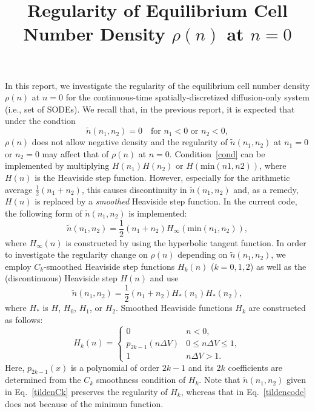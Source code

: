 \documentclass{article}
\begin{document}
\title{Regularity of Equilibrium Cell Number Density $\rho(n)$ at $n=0$}
\author{}
\date{}

\maketitle

\noindent In this report, we investigate the regularity of the equilibrium cell number density $\rho(n)$ at $n=0$ for the continuous-time spatially-discretized diffusion-only system (i.e., set of SODEs).
We recall that, in the previous report, it is expected that under the condtion
\begin{equation}
\label{cond}
\tilde{n}(n_1,n_2) = 0\quad\mbox{for $n_1<0$ or $n_2<0$},
\end{equation}
$\rho(n)$ does not allow negative density and the regularity of $\tilde{n}(n_1,n_2)$ at $n_1=0$ or $n_2=0$ may affect that of $\rho(n)$ at $n=0$.
Condition~\eqref{cond} can be implemented by multiplying $H(n_1)H(n_2)$ or $H(\mathrm{min}(n1,n2))$, where $H(n)$ is the Heaviside step function.
However, especially for the arithmetic average $\frac{1}{2}(n_1+n_2)$, this causes discontinuity in $\tilde{n}(n_1,n_2)$ and, as a remedy, $H(n)$ is replaced by a \textit{smoothed} Heaviside step function.
In the current code, the following form of $\tilde{n}(n_1,n_2)$ is implemented:
\begin{equation}
\label{tildencode}
\tilde{n}(n_1,n_2) = \frac{1}{2}(n_1+n_2)H_\infty(\mathrm{min}(n_1,n_2)),
\end{equation}
where $H_\infty(n)$ is constructed by using the hyperbolic tangent function.
In order to investigate the regularity change on $\rho(n)$ depending on $\tilde{n}(n_1,n_2)$, we employ $C_k$-smoothed Heaviside step functions $H_k(n)$ ($k=0,1,2$) as well as the (discontinuous) Heaviside step $H(n)$ and use 
\begin{equation}
\label{tildenCk}
\tilde{n}(n_1,n_2) = \frac{1}{2}(n_1+n_2)H_*(n_1) H_*(n_2),
\end{equation}
where $H_*$ is $H$, $H_0$, $H_1$, or $H_2$.
Smoothed Heaviside functions $H_k$ are constructed as follows: 
\begin{equation}
H_k(n)=\begin{cases} 
0 & n<0,\\
p_{2k-1}\left(n\Delta V\right) & 0\le n\Delta V\le 1,\\
1 & n\Delta V>1.
\end{cases}
\end{equation}
Here, $p_{2k-1}(x)$ is a polynomial of order $2k-1$ and its $2k$ coefficients are determined from the $C_k$ smoothness condition of $H_k$.
Note that $\tilde{n}(n_1,n_2)$ given in Eq.~\eqref{tildenCk} preserves the regularity of $H_k$, whereas that in Eq.~\eqref{tildencode} does not because of the minimun function.
\end{document}
